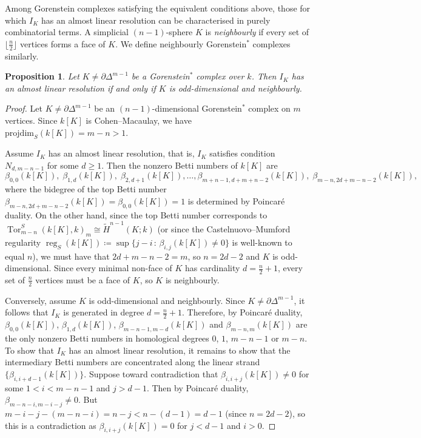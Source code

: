 \documentclass[a4paper,10pt]{amsart}
\newtheorem{proposition}[theorem]{Proposition}
\theoremstyle{definition}
\theoremstyle{remark}
\newcommand{\pd}{\mathrm{projdim}}
\DeclareMathOperator{\Tor}{Tor}
\begin{document}
Among Gorenstein complexes satisfying the equivalent conditions above, those for which $I_K$ has an almost linear resolution can be characterised in purely combinatorial terms. A simplicial $(n-1)$-sphere $K$ is \emph{neighbourly} if every set of $\lfloor\frac{n}{2}\rfloor$ vertices forms a face of $K$. We define neighbourly Gorenstein$^*$ complexes similarly.

\begin{proposition} \label{prop_alin}
Let $K\neq\partial\Delta^{m-1}$ be a Gorenstein$^*$ complex over $k$. Then $I_K$ has an almost linear resolution if and only if $K$ is odd-dimensional and neighbourly.
\end{proposition}

\begin{proof}
Let $K\neq\partial\Delta^{m-1}$ be an $(n-1)$-dimensional Gorenstein$^*$ complex on $m$ vertices. Since $k[K]$ is Cohen--Macaulay, we have $\pd_S(k[K])=m-n>1$.

Assume $I_K$ has an almost linear resolution, that is, $I_K$ satisfies condition $N_{d,m-n-1}$ for some $d\geqslant 1$. Then the nonzero Betti numbers of $k[K]$ are
\[
\beta_{0,0}(k[K]),\; \beta_{1,d}(k[K]),\; \beta_{2,d+1}(k[K]), \ldots, \beta_{m+n-1,d+m+n-2}(k[K]),\; \beta_{m-n,2d+m-n-2}(k[K]),
\]
where the bidegree of the top Betti number $\beta_{m-n,2d+m-n-2}(k[K]) = \beta_{0,0}(k[K])=1$ is determined by Poincar\'e duality. On the other hand, since the top Betti number corresponds to $\Tor^S_{m-n}(k[K],k)_m \cong \widetilde{H}^{n-1}(K;k)$ (or since the Castelnuovo--Mumford regularity $\operatorname{reg}_S(k[K])\coloneqq \sup\{j-i \,:\, \beta_{i,j}(k[K])\neq0\}$ is well-known to equal $n$), we must have that $2d+m-n-2=m$, so $n=2d-2$ and $K$ is odd-dimensional. Since every minimal non-face of $K$ has cardinality $d=\frac{n}{2}+1$, every set of $\frac{n}{2}$ vertices must be a face of $K$, so $K$ is neighbourly.

Conversely, assume $K$ is odd-dimensional and neighbourly. Since $K\neq\partial\Delta^{m-1}$, it follows that $I_K$ is generated in degree $d=\frac{n}{2}+1$. Therefore, by Poincar\'e duality, $\beta_{0,0}(k[K])$, $\beta_{1,d}(k[K])$, $\beta_{m-n-1,m-d}(k[K])$ and $\beta_{m-n,m}(k[K])$ are the only nonzero Betti numbers in homological degrees $0$, $1$, $m-n-1$ or $m-n$. To show that $I_K$ has an almost linear resolution, it remains to show that the intermediary Betti numbers are concentrated along the linear strand $\{\beta_{i,i+d-1}(k[K])\}$. Suppose toward contradiction that $\beta_{i,i+j}(k[K])\neq 0$ for some $1<i<m-n-1$ and $j>d-1$. Then by Poincar\'e duality, $\beta_{m-n-i,m-i-j}\neq 0$. But $m-i-j-(m-n-i)=n-j<n-(d-1)=d-1$ (since $n=2d-2$), so this is a contradiction as $\beta_{i,i+j}(k[K])=0$ for $j<d-1$ and $i>0$.
\end{proof}
\end{document}
